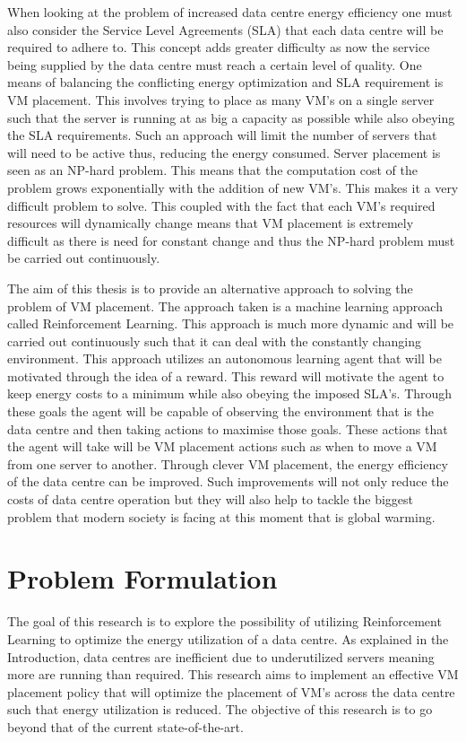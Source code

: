 \documentclass[oneside,12pt]{Classes/RoboticsLaTeX}
\begin{document}
When looking at the problem of increased data centre energy efficiency one must also consider the Service Level Agreements (SLA) that each data centre will be required to adhere to. This concept adds greater difficulty as now the service being supplied by the data centre must reach a certain level of quality. One means of balancing the conflicting energy optimization and SLA requirement is VM placement. This involves trying to place as many VM's on a single server such that the server is running at as big a capacity as possible while also obeying the SLA requirements. Such an approach will limit the number of servers that will need to be active thus, reducing the energy consumed. Server placement is seen as an NP-hard problem. This means that the computation cost of the problem grows exponentially with the addition of new VM's. This makes it a very difficult problem to solve. This coupled with the fact that each VM's required resources will dynamically change means that VM placement is extremely difficult as there is need for constant change and thus the NP-hard problem must be carried out continuously. 

The aim of this thesis is to provide an alternative approach to solving the problem of VM placement. The approach taken is a machine learning approach called Reinforcement Learning. This approach is much more dynamic and will be carried out continuously such that it can deal with the constantly changing environment. This approach utilizes an autonomous learning agent that will be motivated through the idea of a reward. This reward will motivate the agent to keep energy costs to a minimum while also obeying the imposed SLA's. Through these goals the agent will be capable of observing the environment that is the data centre and then taking actions to maximise those goals. These actions that the agent will take will be VM placement actions such as when to move a VM from one server to another. Through clever VM placement, the energy efficiency of the data centre can be improved. Such improvements will not only reduce the costs of data centre operation but they will also help to tackle the biggest problem that modern society is facing at this moment that is global warming. 


\section{Problem Formulation}
The goal of this research is to explore the possibility of utilizing Reinforcement Learning to optimize the energy utilization of a data centre. As explained in the Introduction, data centres are inefficient due to underutilized servers meaning more are running than required. This research aims to implement an effective VM placement policy that will optimize the placement of VM's across the data centre such that energy utilization is reduced. The objective of this research is to go beyond that of the current state-of-the-art.  
\end{document}
